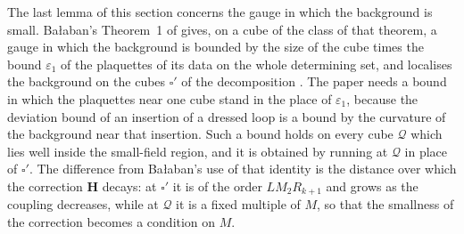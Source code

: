 \documentclass[11pt]{preprint}
\numberwithin{equation}{section}
\theoremstyle{definition}
\theoremstyle{remark}
\theoremstyle{plain}
\begin{document}
The last lemma of this section concerns the gauge in which the background is small. Ba{\l}aban's Theorem~1 of \cite{BalabanVAR} gives, on a cube of the class of that theorem, a gauge in which the background is bounded by the size of the cube times the bound $\varepsilon_1$ of the plaquettes of its data on the whole determining set, and \cite[(3.17), p.~268]{BalabanCRE} localises the background on the cubes $\square'$ of the decomposition \cite[(3.16)]{BalabanCRE}. The paper needs a bound in which the plaquettes near one cube stand in the place of $\varepsilon_1$, because the deviation bound of an insertion of a dressed loop is a bound by the curvature of the background near that insertion. Such a bound holds on every cube $\mathcal Q$ which lies well inside the small-field region, and it is obtained by running \cite[(3.17)]{BalabanCRE} at $\mathcal Q$ in place of $\square'$. The difference from Ba{\l}aban's use of that identity is the distance over which the correction $\mathbf H$ decays: at $\square'$ it is of the order $LM_2R_{k+1}$ and grows as the coupling decreases, while at $\mathcal Q$ it is a fixed multiple of $M$, so that the smallness of the correction becomes a condition on $M$.
\end{document}
